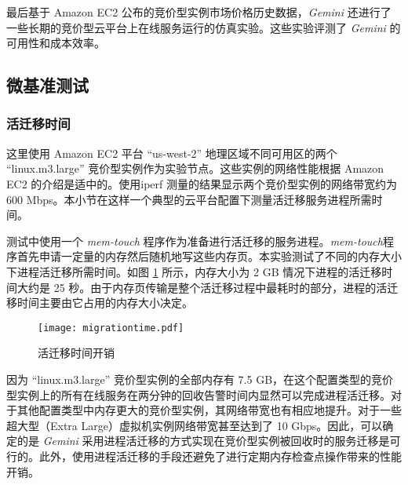 最后基于 Amazon EC2 公布的竞价型实例市场价格历史数据，\emph{Gemini} 还进行了一些长期的竞价型云平台上在线服务运行的仿真实验。这些实验评测了 \emph{Gemini} 的可用性和成本效率。

\subsection{微基准测试}

\subsubsection{活迁移时间}
\label{gemini-migrationtime}
这里使用 Amazon EC2 平台 ``us-west-2'' 地理区域不同可用区的两个 ``linux.m3.large'' 竞价型实例作为实验节点。这些实例的网络性能根据 Amazon EC2 的介绍是适中的。使用iperf \cite{Iperf:2014} 测量的结果显示两个竞价型实例的网络带宽约为 600 Mbps。本小节在这样一个典型的云平台配置下测量活迁移服务进程所需时间。

测试中使用一个 \emph{mem-touch} 程序作为准备进行活迁移的服务进程。\emph{mem-touch}程序首先申请一定量的内存然后随机地写这些内存页。本实验测试了不同的内存大小下进程活迁移所需时间。如图 \ref{figure:migrationtime} 所示，内存大小为 2 GB 情况下进程的活迁移时间大约是 25 秒。由于内存页传输是整个活迁移过程中最耗时的部分，进程的活迁移时间主要由它占用的内存大小决定。
\begin{figure}
  \centering
  \texttt{[image: migrationtime.pdf]}
  \caption{活迁移时间开销}
  \label{figure:migrationtime}
\end{figure}

因为 ``linux.m3.large'' 竞价型实例的全部内存有 7.5 GB，在这个配置类型的竞价型实例上的所有在线服务在两分钟的回收告警时间内显然可以完成进程活迁移。对于其他配置类型中内存更大的竞价型实例，其网络带宽也有相应地提升。对于一些超大型（Extra Large）虚拟机实例网络带宽甚至达到了 10 Gbps。因此，可以确定的是 \emph{Gemini} 采用进程活迁移的方式实现在竞价型实例被回收时的服务迁移是可行的。此外，使用进程活迁移的手段还避免了进行定期内存检查点操作带来的性能开销。

